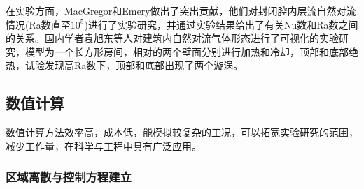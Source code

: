 \documentclass[UTF8]{article} %
\begin{document}
在实验方面，MacGregor和Emery做出了突出贡献，他们对封闭腔内层流自然对流情况(Ra数直至$10^5$)进行了实验研究，并通过实验结果给出了有关Nu数和Ra数之间的关系。国内学者袁旭东等人对建筑内自然对流气体形态进行了可视化的实验研究，模型为一个长方形房间，相对的两个壁面分别进行加热和冷却，顶部和底部绝热，试验发现高Ra数下，顶部和底部出现了两个漩涡。

\subsection{数值计算}

数值计算方法效率高，成本低，能模拟较复杂的工况，可以拓宽实验研究的范围，减少工作量，在科学与工程中具有广泛应用\cite{RN13}。

\subsubsection{区域离散与控制方程建立}
\end{document}

